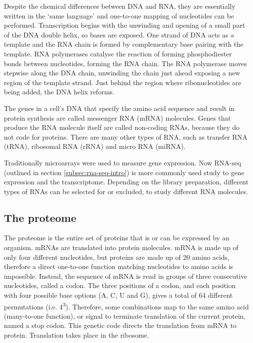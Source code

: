 Despite the chemical differences between DNA and RNA, they are essentially written in the `same language' and one-to-one mapping of nucleotides can be performed.
Transcription begins with the unwinding and opening of a small part of the DNA double helix, so bases are exposed.
One strand of DNA acts as a template and the RNA chain is formed by complementary base pairing with the template.
RNA polymerases catalyse the reaction of forming phosphodiester bonds between nucleotides, forming the RNA chain.
The RNA polymerase moves stepwise along the DNA chain, unwinding the chain just ahead exposing a new region of the template strand.
Just behind the region where ribonucleotides are being added, the DNA helix reforms.

The genes in a cell's DNA that specify the amino acid sequence and result in protein synthesis are called messenger RNA (mRNA) molecules.
Genes that produce the RNA molecule itself are called non-coding RNAs, because they do not code for proteins.
There are many other types of RNA, such as transfer RNA (tRNA), ribosomal RNA (rRNA) and micro RNA (miRNA).

Traditionally microarrays were used to measure gene expression.
Now RNA-seq (outlined in section  \ref{subsec:rna-seq-intro}) is more commonly used study to gene expression and the transcriptome.
Depending on the library preparation, different types of RNAs can be selected for or excluded, to study different RNA molecules.

\subsection{The proteome}\label{subsec:translation}
The proteome is the entire set of proteins that is or can be expressed by an organism.
mRNAs are translated into protein molecules.
mRNA is made up of only four different nucleotides, but proteins are made up of 20 amino acids, therefore a direct one-to-one function matching nucleotides to amino acids is impossible.
Instead, the sequence of mRNA is read in groups of three consecutive nucleotides, called a codon.
The three positions of a codon, and each position with four possible base options (A, C, U and G), gives a total of 64 different permutations (i.e. 4\textsuperscript{3}).
Therefore, some combinations map to the same amino acid (many-to-one function), or signal to terminate translation of the current protein, named a stop codon.
This genetic code directs the translation from mRNA to protein.
Translation takes place in the ribosome.

